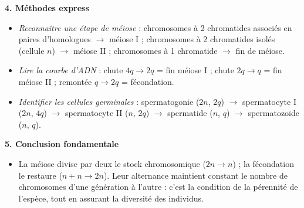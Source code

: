 \documentclass[11pt]{article}
\newcommand{\cle}[1]{{\popxbold\color{popdark}#1}}
\begin{document}
\begin{bilan}
\textbf{4. Méthodes express}
\begin{itemize}
  \item \emph{Reconnaître une étape de méiose} : chromosomes à 2 chromatides associés en paires d'homologues $\to$ méiose I ; chromosomes à 2 chromatides isolés (cellule $n$) $\to$ méiose II ; chromosomes à 1 chromatide $\to$ fin de méiose.
  \item \emph{Lire la courbe d'ADN} : chute $4q \to 2q$ = fin méiose I ; chute $2q \to q$ = fin méiose II ; remontée $q \to 2q$ = fécondation.
  \item \emph{Identifier les cellules germinales} : spermatogonie ($2n$, $2q$) $\to$ spermatocyte I ($2n$, $4q$) $\to$ spermatocyte II ($n$, $2q$) $\to$ spermatide ($n$, $q$) $\to$ spermatozoïde ($n$, $q$).
\end{itemize}

\textbf{5. Conclusion fondamentale}
\begin{itemize}
  \item La méiose divise par deux le stock chromosomique ($2n \to n$) ; la fécondation le restaure ($n + n \to 2n$). Leur alternance maintient constant le nombre de chromosomes d'une génération à l'autre : c'est la condition de la \cle{pérennité de l'espèce}, tout en assurant la diversité des individus.
\end{itemize}
\end{bilan}
\end{document}
